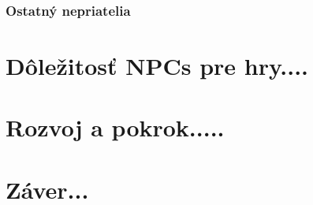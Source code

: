 \documentclass[10pt,twoside,slovak,a4paper]{article}
\begin{document}
\subsubsection{Ostatný nepriatelia} \label{Pesiaci}


\section{Dôležitosť NPCs pre hry....}   \label{Dolezitost}


\section{Rozvoj a pokrok.....}  \label{Rozvoj}
\cite{9730383}
\cite{9291553}

\section{Záver...}




\end{document}
